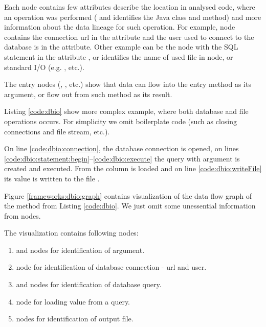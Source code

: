 Each node contains few attributes describe the location in analysed code, where an operation was performed
( and  identifies the Java class and method)
and more information about the data lineage for such operation.
For example,  node contains the connection url in the 
attribute and the user used to connect to the database is in the  attribute.
Other example can be the  node with the SQL statement in the attribute ,
or  identifies the name of used file in  node,
or standard I/O (e.g. , etc.).

The entry nodes (, , etc.) show that data can flow
into the entry method as its argument, or flow out from such method as its result.

Listing \ref{code:dbio} show more complex example, where both database and file
operations occurs. For simplicity we omit boilerplate code (such as closing connections and file stream, etc.).

On line \ref{code:dbio:connection}, the database connection is opened,
on lines \ref{code:dbio:statement:begin}--\ref{code:dbio:execute} the query
with  argument is created and executed. From  the 
column is loaded and on line \ref{code:dbio:writeFile} its value is written to the file .


Figure \ref{frameworks:dbio:graph} contains visualization of the data flow graph
of the  method from Listing \ref{code:dbio}.
We just omit some unessential information from nodes.

The visualization contains following nodes:
\begin{enumerate}
  \item {} and  nodes for identification of  argument.
  \item {} node for identification of database connection - url and user.
  \item {} and  nodes for identification of database query.
  \item {} node for loading value from a query.
  \item {} nodes for identification of output file.
\end{enumerate}

